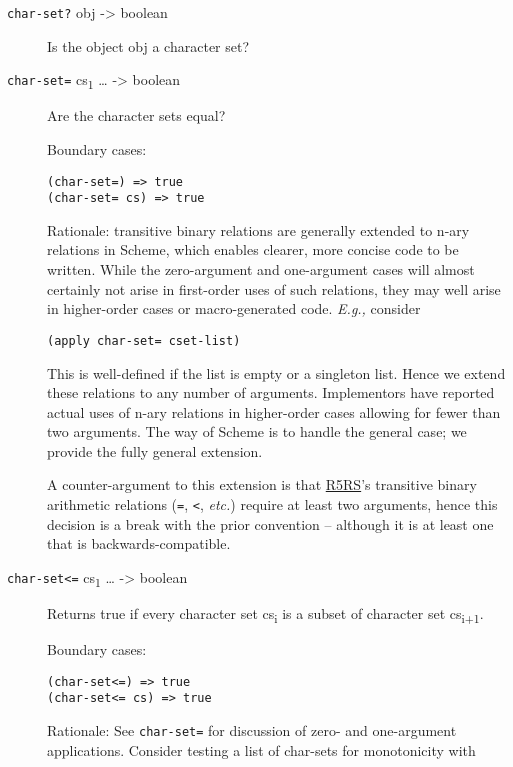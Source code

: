 \begin{description}
\item[ \href{}{} \texttt{char-set?} obj -\textgreater{} boolean ]
Is the object obj a character set?
\item[ \href{}{} \texttt{char-set=} cs\textsubscript{1} \ldots{}
-\textgreater{} boolean ]
Are the character sets equal?

Boundary cases:

\begin{verbatim}
(char-set=) => true
(char-set= cs) => true
\end{verbatim}

Rationale: transitive binary relations are generally extended to n-ary
relations in Scheme, which enables clearer, more concise code to be
written. While the zero-argument and one-argument cases will almost
certainly not arise in first-order uses of such relations, they may well
arise in higher-order cases or macro-generated code. \emph{E.g.,}
consider

\begin{verbatim}
(apply char-set= cset-list)
\end{verbatim}

This is well-defined if the list is empty or a singleton list. Hence we
extend these relations to any number of arguments. Implementors have
reported actual uses of n-ary relations in higher-order cases allowing
for fewer than two arguments. The way of Scheme is to handle the general
case; we provide the fully general extension.

A counter-argument to this extension is that
\protect\hyperlink{R5RS}{R5RS}'s transitive binary arithmetic relations
(\texttt{=}, \texttt{\textless{}}, \emph{etc.}) require at least two
arguments, hence this decision is a break with the prior convention --
although it is at least one that is backwards-compatible.
\item[ \href{}{} \texttt{char-set\textless{}=} cs\textsubscript{1}
\ldots{} -\textgreater{} boolean ]
Returns true if every character set cs\textsubscript{i} is a subset of
character set cs\textsubscript{i+1}.

Boundary cases:

\begin{verbatim}
(char-set<=) => true
(char-set<= cs) => true
\end{verbatim}

Rationale: See \texttt{char-set=} for discussion of zero- and
one-argument applications. Consider testing a list of char-sets for
monotonicity with


\end{description}
